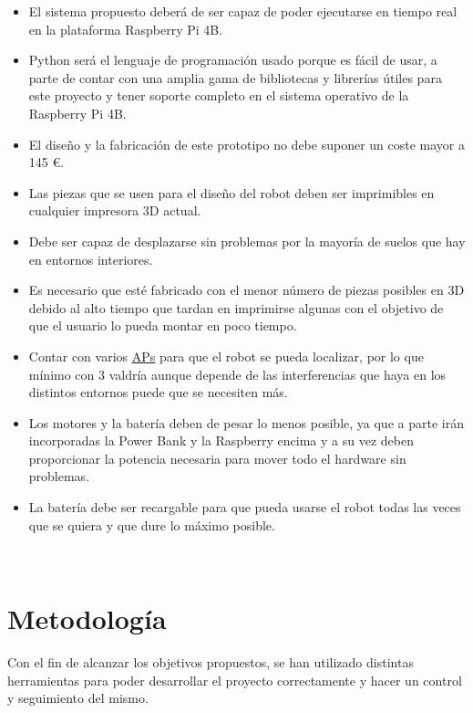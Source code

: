 \begin{itemize}
 \item \textit{} El sistema propuesto deberá de ser capaz de poder ejecutarse en tiempo real en la plataforma Raspberry Pi 4B.
 \item \textit{} Python será el lenguaje de programación usado porque es fácil de usar, a parte de contar con una amplia gama de bibliotecas 
 y librerías útiles para este proyecto y tener soporte completo en el sistema operativo de la Raspberry Pi 4B.
 \item \textit{} El diseño y la fabricación de este prototipo no debe suponer un coste mayor a 145 \euro.
 \item \textit{} Las piezas que se usen para el diseño del robot deben ser imprimibles en cualquier impresora 3D actual.
 \item \textit{} Debe ser capaz de desplazarse sin problemas por la mayoría de suelos que hay en entornos interiores.
 \item \textit{} Es necesario que esté fabricado con el menor número de piezas posibles en 3D debido al alto tiempo que tardan en imprimirse algunas
 con el objetivo de que el usuario lo pueda montar en poco tiempo.
 \item \textit{} Contar con varios \hyperlink{APs}{APs} para que el robot se pueda localizar, por lo que mínimo con 3 valdría aunque depende de las interferencias que haya en los distintos entornos puede que se necesiten más.
 \item \textit{} Los motores y la batería deben de pesar lo menos posible, ya que a parte irán incorporadas la Power Bank y la Raspberry encima y a su vez deben proporcionar la potencia necesaria para mover todo el hardware sin problemas.
 \item \textit{} La batería debe ser recargable para que pueda usarse el robot todas las veces que se quiera y que dure lo máximo posible.
 
\end{itemize}\

 
\section{Metodología}
\label{sec:metodologia}

Con el fin de alcanzar los objetivos propuestos, se han utilizado distintas herramientas para poder desarrollar el proyecto correctamente y
hacer un control y seguimiento del mismo.\\

